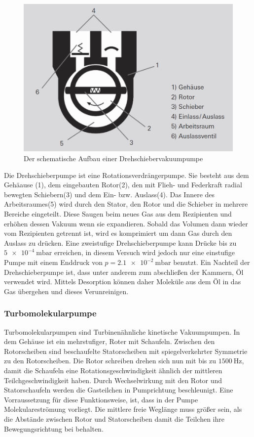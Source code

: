 			\begin{figure}
				\centering
				\includegraphics[width=0.5\linewidth]{"latex/images/Drehschieber.png"}
				\caption{Der schematische Aufbau einer Drehschiebervakuumpumpe}
				\label{fig:dreh}
			\end{figure} Die Drehschieberpumpe ist eine Rotationsverdrängerpumpe. 
			Sie besteht aus dem Gehäause (1), dem eingebauten Rotor(2), den mit Flieh- und Federkraft radial bewegten Schiebern(3) und dem Ein- bzw. Auslass(4). 
			Das Innere des Arbeitsraumes(5) wird durch den Stator, den Rotor und die Schieber in mehrere Bereiche eingeteilt. 
			Diese Saugen beim neues Gas aus dem Rezipienten und erhöhen dessen Vakuum wenn sie expandieren.
			Sobald das Volumen dann wieder vom Rezipienten getrennt ist, wird es komprimiert um dann Gas durch den Auslass zu drücken.
			Eine zweistufige Drehschieberpumpe kann Drücke bis zu $\SI{5e-4}{\milli\bar}$ erreichen, in diesem Versuch wird jedoch nur eine einstufige Pumpe mit einem Enddruck von $p = \SI{2.1 e-2}{\milli\bar}$ benutzt.
			Ein Nachteil der Drehschieberpumpe ist, dass unter anderem zum abschließen der Kammern, Öl verwendet wird.
			Mittels Desorption können daher Moleküle aus dem Öl in das Gas übergehen und dieses Verunreinigen.	 

			\cite{pfeiffer}
		\subsubsection{Turbomolekularpumpe}
		
			\cite{pfeiffer}
			Turbomolekularpumpen sind Turbinenähnliche kinetische Vakuumpumpen. 
			In dem Gehäuse ist ein mehrstufiger, Roter mit Schaufeln.
			Zwischen den Rotorscheiben sind beschaufelte Statorscheiben mit spiegelverkehrter Symmetrie zu den Rotorscheiben.
			Die Rotor schreiben drehen sich nun mit bis zu $\SI{1500}{\hertz}$, damit die Schaufeln eine Rotationsgeschwindigkeit ähnlich der mittleren Teilchgeschwindigkeit haben. 
			Durch Wechselwirkung mit den Rotor und Statorschaufeln werden die Gasteilchen in Pumprichtung beschleunigt.
			Eine Vorraussetzung für diese Funktionsweise, ist, dass in der Pumpe Molekulareströmung vorliegt. 
			Die mittlere freie Weglänge muss größer sein, als die Abstände zwischen Rotor und Statorscheiben damit die Teilchen ihre Bewegungsrichtung bei behalten. 
			  						
